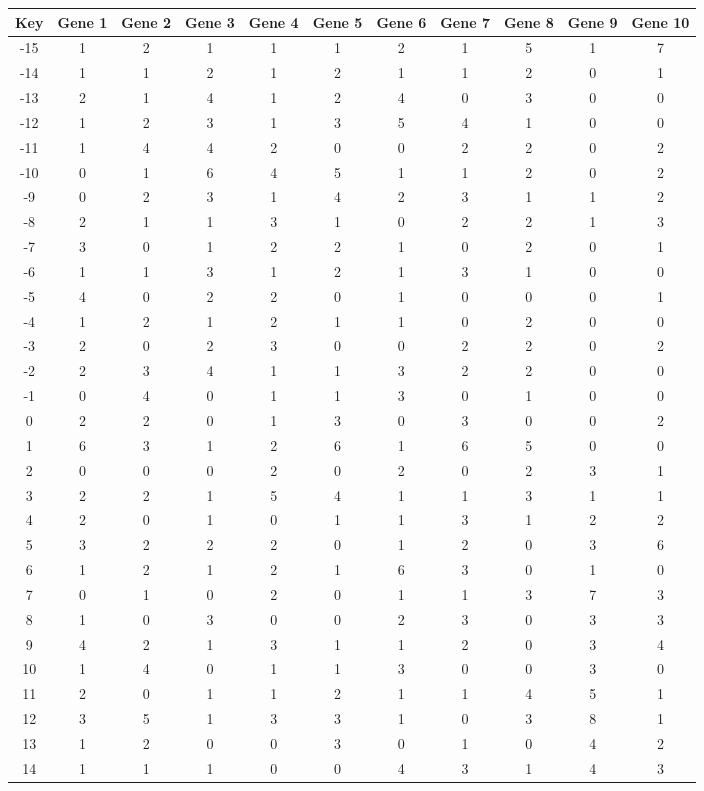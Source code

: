 \begin{tabular}{|c|c|c|c|c|c|c|c|c|c|c|}
\hline
Key & Gene 1 & Gene 2 & Gene 3 & Gene 4 & Gene 5 & Gene 6 & Gene 7 & Gene 8 & Gene 9 & Gene 10 \\
\hline
-15 & 1 & 2 & 1 & 1 & 1 & 2 & 1 & 5 & 1 & 7 \\
-14 & 1 & 1 & 2 & 1 & 2 & 1 & 1 & 2 & 0 & 1 \\
-13 & 2 & 1 & 4 & 1 & 2 & 4 & 0 & 3 & 0 & 0 \\
-12 & 1 & 2 & 3 & 1 & 3 & 5 & 4 & 1 & 0 & 0 \\
-11 & 1 & 4 & 4 & 2 & 0 & 0 & 2 & 2 & 0 & 2 \\
-10 & 0 & 1 & 6 & 4 & 5 & 1 & 1 & 2 & 0 & 2 \\
-9 & 0 & 2 & 3 & 1 & 4 & 2 & 3 & 1 & 1 & 2 \\
-8 & 2 & 1 & 1 & 3 & 1 & 0 & 2 & 2 & 1 & 3 \\
-7 & 3 & 0 & 1 & 2 & 2 & 1 & 0 & 2 & 0 & 1 \\
-6 & 1 & 1 & 3 & 1 & 2 & 1 & 3 & 1 & 0 & 0 \\
-5 & 4 & 0 & 2 & 2 & 0 & 1 & 0 & 0 & 0 & 1 \\
-4 & 1 & 2 & 1 & 2 & 1 & 1 & 0 & 2 & 0 & 0 \\
-3 & 2 & 0 & 2 & 3 & 0 & 0 & 2 & 2 & 0 & 2 \\
-2 & 2 & 3 & 4 & 1 & 1 & 3 & 2 & 2 & 0 & 0 \\
-1 & 0 & 4 & 0 & 1 & 1 & 3 & 0 & 1 & 0 & 0 \\
0 & 2 & 2 & 0 & 1 & 3 & 0 & 3 & 0 & 0 & 2 \\
1 & 6 & 3 & 1 & 2 & 6 & 1 & 6 & 5 & 0 & 0 \\
2 & 0 & 0 & 0 & 2 & 0 & 2 & 0 & 2 & 3 & 1 \\
3 & 2 & 2 & 1 & 5 & 4 & 1 & 1 & 3 & 1 & 1 \\
4 & 2 & 0 & 1 & 0 & 1 & 1 & 3 & 1 & 2 & 2 \\
5 & 3 & 2 & 2 & 2 & 0 & 1 & 2 & 0 & 3 & 6 \\
6 & 1 & 2 & 1 & 2 & 1 & 6 & 3 & 0 & 1 & 0 \\
7 & 0 & 1 & 0 & 2 & 0 & 1 & 1 & 3 & 7 & 3 \\
8 & 1 & 0 & 3 & 0 & 0 & 2 & 3 & 0 & 3 & 3 \\
9 & 4 & 2 & 1 & 3 & 1 & 1 & 2 & 0 & 3 & 4 \\
10 & 1 & 4 & 0 & 1 & 1 & 3 & 0 & 0 & 3 & 0 \\
11 & 2 & 0 & 1 & 1 & 2 & 1 & 1 & 4 & 5 & 1 \\
12 & 3 & 5 & 1 & 3 & 3 & 1 & 0 & 3 & 8 & 1 \\
13 & 1 & 2 & 0 & 0 & 3 & 0 & 1 & 0 & 4 & 2 \\
14 & 1 & 1 & 1 & 0 & 0 & 4 & 3 & 1 & 4 & 3 \\
\hline
\end{tabular}